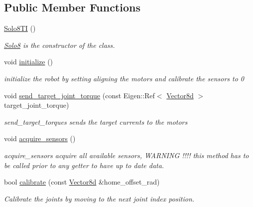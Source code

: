 \subsection*{Public Member Functions}
\begin{DoxyCompactItemize}
\item 
\hyperlink{classblmc__robots_1_1Solo8TI_a5f969910cd1f1b263297e02691a0df5a}{Solo8\+TI} ()
\begin{DoxyCompactList}\small\item\em \hyperlink{classblmc__robots_1_1Solo8}{Solo8} is the constructor of the class. \end{DoxyCompactList}\item 
void \hyperlink{classblmc__robots_1_1Solo8TI_adf9f5ed10293942b1ce06d0d0116f61c}{initialize} ()
\begin{DoxyCompactList}\small\item\em initialize the robot by setting aligning the motors and calibrate the sensors to 0 \end{DoxyCompactList}\item 
\mbox{\label{classblmc__robots_1_1Solo8TI_a5299053c499b95be35685aed60fc8d50}} 
void \hyperlink{classblmc__robots_1_1Solo8TI_a5299053c499b95be35685aed60fc8d50}{send\+\_\+target\+\_\+joint\+\_\+torque} (const Eigen\+::\+Ref$<$ \hyperlink{common__header_8hpp_a98975ffbe0bca1296078e0350dfedd60}{Vector8d} $>$ target\+\_\+joint\+\_\+torque)
\begin{DoxyCompactList}\small\item\em send\+\_\+target\+\_\+torques sends the target currents to the motors \end{DoxyCompactList}\item 
void \hyperlink{classblmc__robots_1_1Solo8TI_a9241d0a805efd871a56d7cace099c208}{acquire\+\_\+sensors} ()
\begin{DoxyCompactList}\small\item\em acquire\+\_\+sensors acquire all available sensors, W\+A\+R\+N\+I\+NG !!!! this method has to be called prior to any getter to have up to date data. \end{DoxyCompactList}\item 
bool \hyperlink{classblmc__robots_1_1Solo8TI_a8ff4ec509f904ab3fab7268c75065c1f}{calibrate} (const \hyperlink{common__header_8hpp_a98975ffbe0bca1296078e0350dfedd60}{Vector8d} \&home\+\_\+offset\+\_\+rad)
\begin{DoxyCompactList}\small\item\em Calibrate the joints by moving to the next joint index position. \end{DoxyCompactList}\item 

\end{DoxyCompactItemize}
